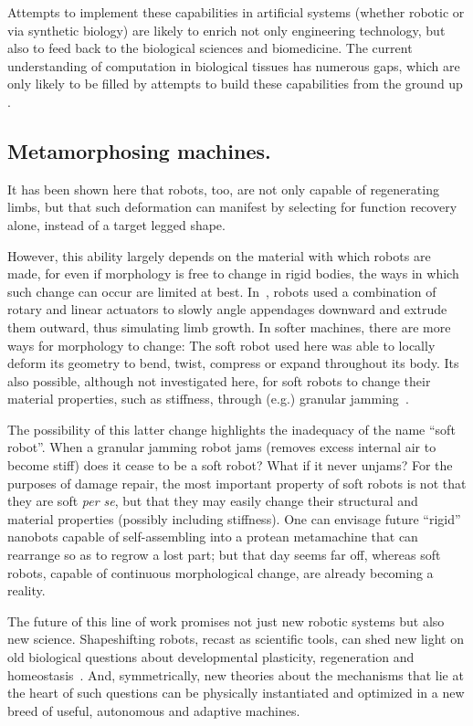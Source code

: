 Attempts to implement these capabilities in artificial systems (whether robotic or via synthetic biology) are likely to enrich not only engineering technology, but also to feed back to the biological sciences and biomedicine. 
The current understanding of computation in biological tissues has numerous gaps, which are only likely to be filled by attempts to build these capabilities from the ground up \cite{kamm2018perspective}. 


\subsection{Metamorphosing machines.}

It has been shown here that robots, too, are not only capable of regenerating limbs, but that such deformation can manifest by selecting for function recovery alone, instead of a target legged shape.


However, this ability largely depends on the material with which robots are made, for even if morphology is free to change in rigid bodies, the ways in which such change can occur are limited at best.
In~\cite{bongard2011morphological}, robots used a combination of rotary and linear actuators to slowly angle appendages downward and extrude them outward, thus simulating limb growth.
In softer machines, there are more ways for morphology to change: 
The soft robot used here was able to locally deform its geometry to bend, twist, compress or expand throughout its body.
Its also possible, although not investigated here, for soft robots to change their material properties, such as stiffness, 
through (e.g.) granular jamming~\cite{brown2010universal,kriegman2018interoceptive}. 


The possibility of this latter change highlights the inadequacy of the name ``soft robot''.
When a granular jamming robot jams (removes excess internal air to become stiff) does it cease to be a soft robot?
What if it never unjams?
For the purposes of damage repair, the most important property of soft robots is not that they are soft \textit{per se}, but that they may easily change their structural and material properties (possibly including stiffness).
One can envisage future ``rigid'' nanobots capable of self-assembling into a protean metamachine that can rearrange so as to regrow a lost part; but that day seems far off, whereas soft robots, capable of continuous morphological change, are already becoming a reality.


The future of this line of work promises not just new robotic systems but also new science. Shapeshifting robots, recast as scientific tools, can shed new light on old biological questions about developmental plasticity, regeneration and homeostasis~\cite{kriegman2017minimal,kriegman2018morphological,lobo2012modeling}.
And, symmetrically, new theories about the mechanisms that lie at the heart of such questions can be physically instantiated and optimized in a new breed of useful, autonomous and adaptive machines.


